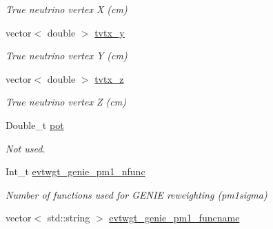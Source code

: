 \begin{DoxyCompactItemize}
\begin{DoxyCompactList}\small\item\em True neutrino vertex X (cm) \end{DoxyCompactList}\item 
\hypertarget{classUBXSecEvent_aa6532549e8c9763ae285a98976a80a94}{vector$<$ double $>$ \hyperlink{classUBXSecEvent_aa6532549e8c9763ae285a98976a80a94}{tvtx\-\_\-y}}\label{classUBXSecEvent_aa6532549e8c9763ae285a98976a80a94}

\begin{DoxyCompactList}\small\item\em True neutrino vertex Y (cm) \end{DoxyCompactList}\item 
\hypertarget{classUBXSecEvent_afcae666a9433c56792d47c53856d66ac}{vector$<$ double $>$ \hyperlink{classUBXSecEvent_afcae666a9433c56792d47c53856d66ac}{tvtx\-\_\-z}}\label{classUBXSecEvent_afcae666a9433c56792d47c53856d66ac}

\begin{DoxyCompactList}\small\item\em True neutrino vertex Z (cm) \end{DoxyCompactList}\item 
\hypertarget{classUBXSecEvent_ad783d4eedd7be14db4d5b7b9cb2d144a}{Double\-\_\-t \hyperlink{classUBXSecEvent_ad783d4eedd7be14db4d5b7b9cb2d144a}{pot}}\label{classUBXSecEvent_ad783d4eedd7be14db4d5b7b9cb2d144a}

\begin{DoxyCompactList}\small\item\em Not used. \end{DoxyCompactList}\item 
\hypertarget{classUBXSecEvent_ad1177a36bb2c33b81920972cdb47de19}{Int\-\_\-t \hyperlink{classUBXSecEvent_ad1177a36bb2c33b81920972cdb47de19}{evtwgt\-\_\-genie\-\_\-pm1\-\_\-nfunc}}\label{classUBXSecEvent_ad1177a36bb2c33b81920972cdb47de19}

\begin{DoxyCompactList}\small\item\em Number of functions used for G\-E\-N\-I\-E reweighting (pm1sigma) \end{DoxyCompactList}\item 
\hypertarget{classUBXSecEvent_adeaa0849fbd3c9013fb1bc8f430eae09}{vector$<$ std\-::string $>$ \hyperlink{classUBXSecEvent_adeaa0849fbd3c9013fb1bc8f430eae09}{evtwgt\-\_\-genie\-\_\-pm1\-\_\-funcname}}\label{classUBXSecEvent_adeaa0849fbd3c9013fb1bc8f430eae09}


\end{DoxyCompactItemize}
